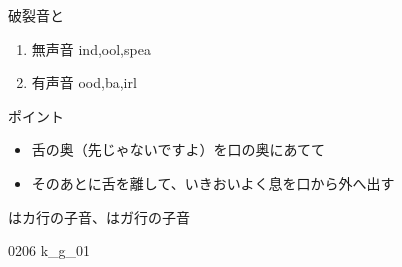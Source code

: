 \documentclass[aspectratio=169, xcolor={dvipsnames,table}]{beamer}
\begin{document}
\begin{frame}[plain,label=slide_k_g]{破裂音と}
  \large

  \begin{enumerate}
    \item 無声音 \hspace{20pt}ind,\hspace{1\zw}ool,\hspace{1\zw}spea

    \item 有声音 \hspace{20pt}ood,\hspace{1\zw}ba,\hspace{1\zw}irl
  \end{enumerate}

  \vspace*{20pt}

  \normalsize ポイント

  \begin{itemize}
    [circle]

    \item 舌の奥（先じゃないですよ）を口の奥にあてて

    \item そのあとに舌を離して、いきおいよく息を口から外へ出す
  \end{itemize}

   はカ行の子音、はガ行の子音


  \hfill{\tiny 0206}\,{\scriptsize {}\,{\tiny k\_g\_01}}
\end{frame}
\end{document}
